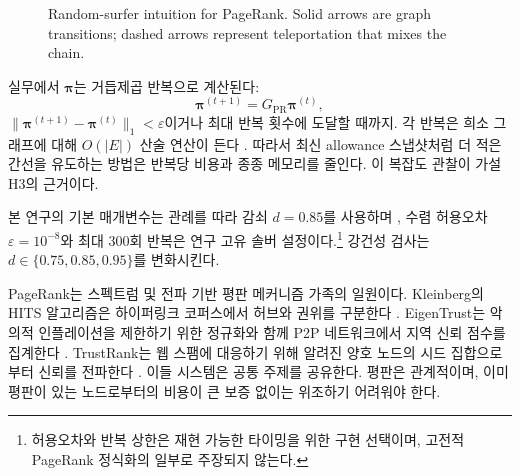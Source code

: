 \begin{figure}[htbp]
\centering
{}
\caption{Random-surfer intuition for PageRank. Solid arrows are graph transitions; dashed arrows represent teleportation that mixes the chain.}
\label{fig:random-surfer}
\end{figure}


실무에서 $\boldsymbol{\pi}$는 거듭제곱 반복으로 계산된다:
\begin{equation}
\boldsymbol{\pi}^{(t+1)} = G_{\mathrm{PR}}\boldsymbol{\pi}^{(t)},
\label{eq:power-iteration}
\end{equation}
$\|\boldsymbol{\pi}^{(t+1)}-\boldsymbol{\pi}^{(t)}\|_1 < \varepsilon$이거나 최대 반복 횟수에 도달할 때까지. 각 반복은 희소 그래프에 대해 $O(|E|)$ 산술 연산이 든다 . 따라서 최신 allowance 스냅샷처럼 더 적은 간선을 유도하는 방법은 반복당 비용과 종종 메모리를 줄인다. 이 복잡도 관찰이 가설 H3의 근거이다.

본 연구의 기본 매개변수는 관례를 따라 감쇠 $d=0.85$를 사용하며 , 수렴 허용오차 $\varepsilon=10^{-8}$와 최대 $300$회 반복은 연구 고유 솔버 설정이다.\footnote{허용오차와 반복 상한은 재현 가능한 타이밍을 위한 구현 선택이며, 고전적 PageRank 정식화의 일부로 주장되지 않는다.} 강건성 검사는 $d\in\{0.75,0.85,0.95\}$를 변화시킨다.


PageRank는 스펙트럼 및 전파 기반 평판 메커니즘 가족의 일원이다. Kleinberg의 HITS 알고리즘은 하이퍼링크 코퍼스에서 허브와 권위를 구분한다 . EigenTrust는 악의적 인플레이션을 제한하기 위한 정규화와 함께 P2P 네트워크에서 지역 신뢰 점수를 집계한다 . TrustRank는 웹 스팸에 대응하기 위해 알려진 양호 노드의 시드 집합으로부터 신뢰를 전파한다 . 이들 시스템은 공통 주제를 공유한다. 평판은 관계적이며, 이미 평판이 있는 노드로부터의 비용이 큰 보증 없이는 위조하기 어려워야 한다.

